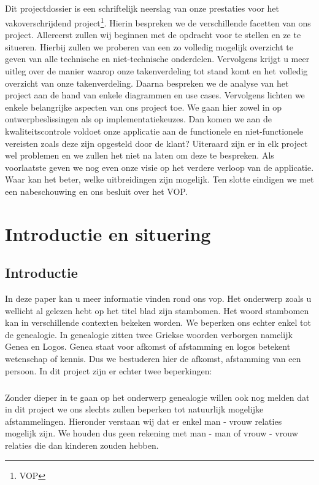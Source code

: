 \documentclass[pdftex,a4paper,12pt,twoside]{report}
\begin{document}
\paragraph{}
Dit projectdossier is een schriftelijk neerslag van onze prestaties voor het vakoverschrijdend project\footnote{VOP}. Hierin bespreken we de verschillende facetten van ons project. 
Allereerst zullen wij beginnen met de opdracht voor te stellen en ze te situeren. Hierbij zullen we proberen van een zo volledig mogelijk overzicht te geven van alle technische en niet-technische onderdelen. Vervolgens krijgt u meer uitleg over de manier waarop onze takenverdeling tot stand komt en het volledig overzicht van onze takenverdeling.
Daarna bespreken we de analyse van het project aan de hand van enkele diagrammen en use cases. Vervolgens lichten we enkele belangrijke aspecten van ons project toe. We gaan hier zowel in op ontwerpbeslissingen als op implementatiekeuzes. Dan komen we aan de kwaliteitscontrole voldoet onze applicatie aan de functionele en niet-functionele vereisten zoals deze zijn opgesteld door de klant? Uiteraard zijn er in elk project wel problemen en we zullen het niet na laten om deze te bespreken. Als voorlaatste geven we nog even onze visie op het verdere verloop van de applicatie. Waar kan het beter, welke uitbreidingen zijn mogelijk. Ten slotte eindigen we met een nabeschouwing en ons besluit over het VOP.
\chapter{Introductie en situering}\label{ch:introduction}

\section{Introductie}
In deze paper kan u meer informatie vinden rond ons vop. Het onderwerp zoals u wellicht al gelezen hebt op het titel blad zijn stambomen. Het woord stambomen kan in verschillende contexten bekeken worden. We beperken ons echter enkel tot de genealogie. In genealogie zitten twee Griekse woorden verborgen namelijk Genea en Logos. Genea staat voor afkomst of afstamming en logos betekent wetenschap of kennis. 
Dus we bestuderen hier de afkomst, afstamming van een persoon.
In dit project zijn er echter twee beperkingen:
\paragraph{}
Zonder dieper in te gaan op het onderwerp genealogie willen ook nog melden dat in dit project we ons slechts zullen beperken tot natuurlijk mogelijke afstammelingen. Hieronder verstaan wij dat er enkel man - vrouw relaties mogelijk zijn. We houden dus geen rekening met man - man of vrouw - vrouw relaties die dan kinderen zouden hebben.
\end{document}
